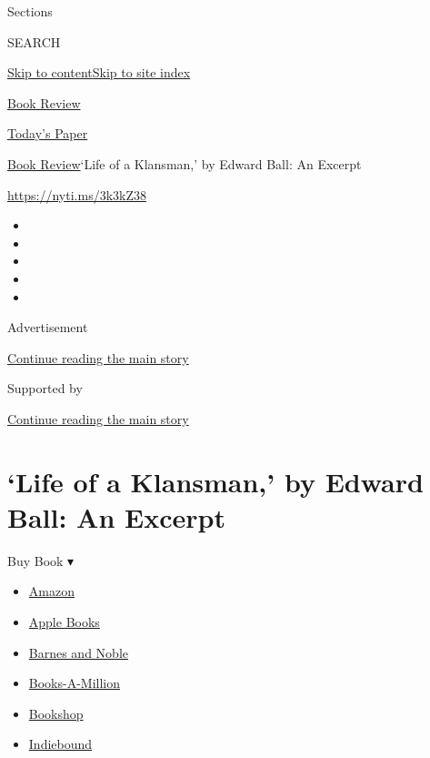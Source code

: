 Sections

SEARCH

\protect\hyperlink{site-content}{Skip to
content}\protect\hyperlink{site-index}{Skip to site index}

\href{https://www.nytimes.com/section/books/review}{Book Review}

\href{https://myaccount.nytimes.com/auth/login?response_type=cookie\&client_id=vi}{}

\href{https://www.nytimes.com/section/todayspaper}{Today's Paper}

\href{/section/books/review}{Book Review}\textbar{}`Life of a Klansman,'
by Edward Ball: An Excerpt

\url{https://nyti.ms/3k3kZ38}

\begin{itemize}
\item
\item
\item
\item
\item
\end{itemize}

Advertisement

\protect\hyperlink{after-top}{Continue reading the main story}

Supported by

\protect\hyperlink{after-sponsor}{Continue reading the main story}

\hypertarget{life-of-a-klansman-by-edward-ball-an-excerpt}{%
\section{`Life of a Klansman,' by Edward Ball: An
Excerpt}\label{life-of-a-klansman-by-edward-ball-an-excerpt}}

Buy Book ▾

\begin{itemize}
\tightlist
\item
  \href{https://www.amazon.com/gp/search?index=books\&tag=NYTBSREV-20\&field-keywords=Life+of+a+Klansman\%3A+A+Family+History+in+White+Supremacy+Edward+Ball}{Amazon}
\item
  \href{https://du-gae-books-dot-nyt-du-prd.appspot.com/buy?title=Life+of+a+Klansman\%3A+A+Family+History+in+White+Supremacy\&author=Edward+Ball}{Apple
  Books}
\item
  \href{https://www.anrdoezrs.net/click-7990613-11819508?url=https\%3A\%2F\%2Fwww.barnesandnoble.com\%2Fw\%2F\%3Fean\%3D9780374186326}{Barnes
  and Noble}
\item
  \href{https://www.anrdoezrs.net/click-7990613-35140?url=https\%3A\%2F\%2Fwww.booksamillion.com\%2Fp\%2FLife\%2Bof\%2Ba\%2BKlansman\%253A\%2BA\%2BFamily\%2BHistory\%2Bin\%2BWhite\%2BSupremacy\%2FEdward\%2BBall\%2F9780374186326}{Books-A-Million}
\item
  \href{https://bookshop.org/a/3546/9780374186326}{Bookshop}
\item
  \href{https://www.indiebound.org/book/9780374186326?aff=NYT}{Indiebound}
\end{itemize}

